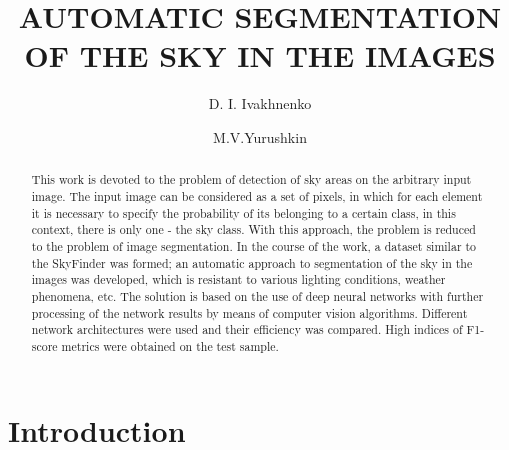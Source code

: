 \documentclass[runningheads]{llncs}
\begin{document}
%
\title{AUTOMATIC SEGMENTATION OF THE SKY IN THE IMAGES}
%
%
\author{D. I. Ivakhnenko \and
M.V.Yurushkin}
%
%
%
\maketitle              %
%
\begin{abstract}
This work is devoted to the problem of detection of sky areas on the
arbitrary input image. The input image can be considered as a set of pixels, in which for each element it is necessary to specify the probability of its belonging to a certain class, in this context, there is only one - the sky class. With this approach, the problem is reduced to the problem of image segmentation. In the course of the work, a dataset similar to the SkyFinder was formed; an automatic approach to segmentation of the sky in the images was developed, which is resistant to various lighting conditions, weather phenomena, etc. The solution is based on the use of deep neural networks with further processing of the network results by means of computer vision algorithms. Different network architectures were used and their efficiency was compared. High indices of F1-score metrics were obtained on the test sample.

\end{abstract}
%
%
%

\section{Introduction}
\end{document}
